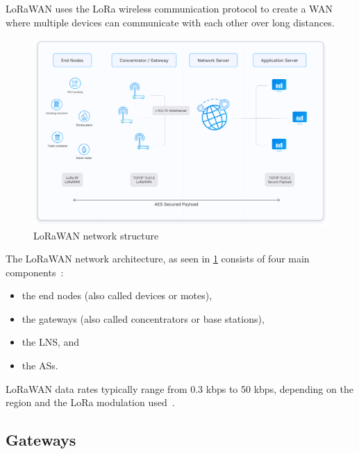 \ac{LoRaWAN} uses the LoRa wireless communication protocol to create a \ac{WAN} where multiple devices can communicate with each other over long distances.

\begin{figure}[h]
    \centering
    \includegraphics[width=1\textwidth]{pictures/lorawan-structure/lorawan-architecture.png}
    \caption{\ac{LoRaWAN} network structure~\protect\cite{the_things_industries_bv_lorawan_nodate}}\label{pic:lorawan-network-structure}
\end{figure}

The \ac{LoRaWAN} network architecture, as seen in \cref{pic:lorawan-network-structure} consists of four main components~\cite[p. 8]{lora_alliance_inc_lorawan_2017}:

\begin{itemize}
    \item the end nodes (also called devices or motes),
    \item the gateways (also called concentrators or base stations),
    \item the \ac{LNS}, and
    \item the \acp{AS}.
\end{itemize}

\ac{LoRaWAN} data rates typically range from 0.3 kbps to 50 kbps, depending on the region and the \ac{LoRa} modulation used~\cite[p. 8]{lora_alliance_inc_lorawan_2017}.

\subsection{Gateways}

